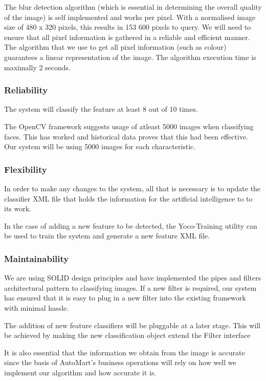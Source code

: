 The blur detection algorithm (which is essential in determining the overall quality of the image) is self implemented and works per pixel. With a normalised image size of 480 x 320 pixels, this results in 153 600 pixels to query. We will need to ensure that all pixel information is gathered in a reliable and efficient manner. The algorithm that we use to get all pixel information (such as colour) guarantees a linear representation of the image. The algorithm execution time is maximally 2 seconds.

\subsubsection{Reliability}
The system will classify the feature at least 8 out of 10 times.

The OpenCV framework suggests usage of atleast 5000 images when classifying faces. This has worked and historical data proves that this had been effective. Our system will be using 5000 images for each characteristic.

\subsubsection{Flexibility}
In order to make any changes to the system, all that is necessary is to update the classifier XML file that holds the information for the artificial intelligence to to its work.

In the case of adding a new feature to be detected, the Yoco-Training utility can be used to train the system and generate a new feature XML file.

\subsubsection{Maintainability}
We are using SOLID design principles and have implemented the pipes and filters architectural pattern to classifying images. If a new filter is required, our system has ensured that it is easy to plug in a new filter into the existing framework with minimal hassle.

The addition of new feature classifiers will be pluggable at a later stage. This will be achieved by making the new classification object extend the Filter interface

It is also essential that the information we obtain from the image is accurate since the basis of AutoMart's business operations will rely on how well we implement our algorithm and how accurate it is. %

